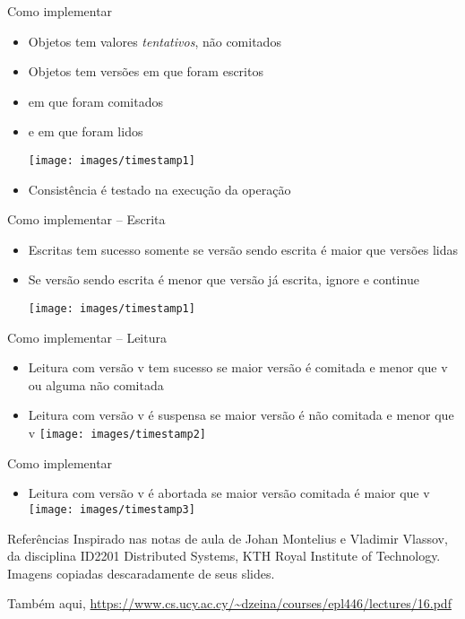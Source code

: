 \begin{frame}{Como implementar}
\begin{itemize}
	\item Objetos tem valores \emph{tentativos}, não comitados
	\item Objetos tem versões em que foram escritos
	\item em que foram comitados
	\item e em que foram lidos
	
	\texttt{[image: images/timestamp1]}

	\item Consistência é testado na execução da operação
	
\end{itemize}
\end{frame}

\begin{frame}{Como implementar -- Escrita}
\begin{itemize}
	\item Escritas tem sucesso somente se versão sendo escrita é maior que versões lidas
	\item Se versão sendo escrita é menor que versão já escrita, ignore e continue

	\texttt{[image: images/timestamp1]}
\end{itemize}
\end{frame}

\begin{frame}{Como implementar -- Leitura}
\begin{itemize}
	\item Leitura com versão v tem sucesso se maior versão é comitada e menor que v ou alguma não comitada
	\item Leitura com versão v é suspensa se maior versão é não comitada e menor que v
	\texttt{[image: images/timestamp2]}
\end{itemize}
\end{frame}

\begin{frame}{Como implementar}
\begin{itemize}
	\item Leitura com versão v é abortada se maior versão comitada é maior que v
	\texttt{[image: images/timestamp3]}	
\end{itemize}
\end{frame}


\begin{frame}{Referências}
Inspirado nas notas de aula de Johan Montelius e Vladimir Vlassov, da disciplina ID2201 Distributed Systems, KTH Royal Institute of Technology. Imagens copiadas descaradamente de seus slides.

Também aqui, \url{https://www.cs.ucy.ac.cy/~dzeina/courses/epl446/lectures/16.pdf}
\end{frame}




